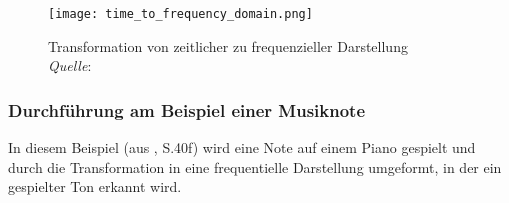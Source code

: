 







%
\begin{figure}[h]
    \texttt{[image: time\_to\_frequency\_domain.png]}
    \caption[Transformation von zeitlicher zu frequenzieller Darstellung]{Transformation von zeitlicher zu frequenzieller Darstellung\\\hspace{\textwidth}\textit{Quelle}: \cite{music_extraction}}
    \label{fig:frequency_to_time}
\end{figure}
%

\subsubsection{Durchführung am Beispiel einer Musiknote}

In diesem Beispiel (aus \cite{fundamentals_of_music_processing}, S.40f) wird eine Note auf einem Piano gespielt und durch die Transformation in eine frequentielle Darstellung umgeformt, in der ein gespielter Ton erkannt wird.

\par

